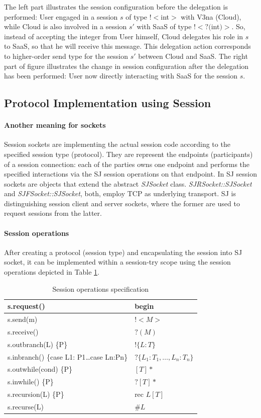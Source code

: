 \documentclass{llncs}
\begin{document}
The left part illustrates the session configuration before the delegation is performed: User engaged in a session $s$ of type $!<$int$>$ with V3na (Cloud), while Cloud is also involved in a session $s'$ with SaaS of type $!<?($int$)>$. So, instead of accepting the integer from User himself, Cloud delegates his role in $s$ to SaaS, so that he will receive this message. This delegation action corresponds to higher-order send type for the session $s'$ between Cloud and SaaS. The right part of figure illustrates the change in session configuration after the delegation has been performed: User now directly interacting with SaaS for the session $s$.

\subsection{Protocol Implementation using Session}
\paragraph{Another meaning for sockets}
Session sockets are implementing the actual session code according to the specified session type (protocol). They are represent the endpoints (participants) of a session connection: each of the parties owns one endpoint and performs the specified interactions via the SJ session operations on that endpoint. In SJ session sockets are objects that extend the abstract \textit{SJSocket} class. \textit{SJRSocket::SJSocket} and \textit{SJFSocket::SJSocket}, both, employ TCP as underlying transport. SJ is distinguishing session client and server sockets, where the former are used to request sessions from the latter.

\paragraph{Session operations}
After creating a protocol (session type) and encapsulating the session into SJ socket, it can be implemented within a session-try scope using the session operations depicted in Table \ref{tab:session-ops}.

\begin{longtable}{|p{}|p{}|}
\caption{Session operations specification}\label{tab:session-ops}\\ \hline
s.request() & begin \\ \hline 
s.send(m) & $!<M>$ \\ \hline
s.receive() & $?(M)$ \\ \hline
s.outbranch(L) \{P\} & $!\{L:T\}$ \\ \hline
s.inbranch() \{case L1: {P1}\dots case Ln:{Pn}\} & $?\{L_1:T_1,\dots, L_n:T_n\}$ \\ \hline
s.outwhile(cond) \{P\} & $[T]*$ \\ \hline
s.inwhile() \{P\} & $?[T]*$ \\ \hline
s.recursion(L) \{P\} & rec $L[T]$ \\ \hline
s.recurse(L) & $\#L$ \\ \hline
\end{longtable}
\end{document}

